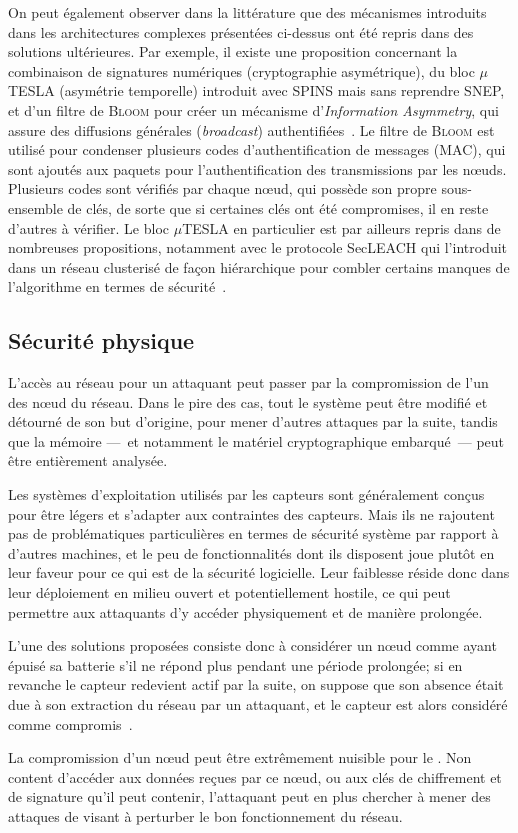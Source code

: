 On peut également observer dans la littérature que des mécanismes introduits dans les architectures complexes présentées ci-dessus ont été repris dans des solutions ultérieures.
Par exemple, il existe une proposition concernant la combinaison de signatures numériques (cryptographie asymétrique), du bloc $\mu$TESLA (asymétrie temporelle) introduit avec SPINS mais sans reprendre SNEP, et d'un filtre de \textsc{Bloom} pour créer un mécanisme d'\textit{Information Asymmetry}, qui assure des diffusions générales (\textit{broadcast}) authentifiées~\cite{SLS10}.
Le filtre de \textsc{Bloom} est utilisé pour condenser plusieurs codes d'authentification de messages (MAC), qui sont ajoutés aux paquets pour l'authentification des transmissions par les nœuds.
Plusieurs codes sont vérifiés par chaque nœud, qui possède son propre sous-ensemble de clés, de sorte que si certaines clés ont été compromises, il en reste d'autres à vérifier.
Le bloc $\mu$TESLA en particulier est par ailleurs repris dans de nombreuses propositions, notamment avec le protocole SecLEACH qui l'introduit dans un réseau clusterisé de façon hiérarchique pour combler certains manques de l'algorithme \leach en termes de sécurité~\cite{OFVWBDL07}.

\subsection{Sécurité physique}

L'accès au réseau pour un attaquant peut passer par la compromission de l'un des nœud du réseau.
Dans le pire des cas, tout le système peut être modifié et détourné de son but d'origine, pour mener d'autres attaques par la suite, tandis que la mémoire ---~et notamment le matériel cryptographique embarqué~--- peut être entièrement analysée.

Les systèmes d'exploitation utilisés par les capteurs sont généralement conçus pour être légers et s'adapter aux contraintes des capteurs.
Mais ils ne rajoutent pas de problématiques particulières en termes de sécurité système par rapport à d'autres machines, et le peu de fonctionnalités dont ils disposent joue plutôt en leur faveur pour ce qui est de la sécurité logicielle.
Leur faiblesse réside donc dans leur déploiement en milieu ouvert et potentiellement hostile, ce qui peut permettre aux attaquants d'y accéder physiquement et de manière prolongée.

L'une des solutions proposées consiste donc à considérer un nœud comme ayant épuisé sa batterie s'il ne répond plus pendant une période prolongée; si en revanche le capteur redevient actif par la suite, on suppose que son absence était due à son extraction du réseau par un attaquant, et le capteur est alors considéré comme compromis~\cite{Ho10}.

La compromission d'un nœud peut être extrêmement nuisible pour le \rc.
Non content d'accéder aux données reçues par ce nœud, ou aux clés de chiffrement et de signature qu'il peut contenir, l'attaquant peut en plus chercher à mener des attaques de \dds visant à perturber le bon fonctionnement du réseau.

